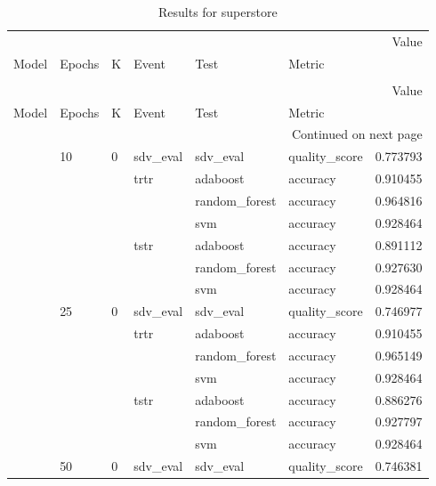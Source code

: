 \begin{longtable}{llllllr}
\caption{Results for superstore} \\
\toprule
 &  &  &  &  &  & Value \\
Model & Epochs & K & Event & Test & Metric &  \\
\midrule
\endfirsthead
\caption[]{Results for superstore} \\
\toprule
 &  &  &  &  &  & Value \\
Model & Epochs & K & Event & Test & Metric &  \\
\midrule
\endhead
\midrule
\multicolumn{7}{r}{Continued on next page} \\
\midrule
\endfoot
\bottomrule
\endlastfoot
\multirow[t]{35}{*}{CTGAN} & \multirow[t]{7}{*}{10} & \multirow[t]{7}{*}{0} & sdv_eval & sdv_eval & quality_score & 0.773793 \\
\cline{4-7} \cline{5-7}
 &  &  & \multirow[t]{3}{*}{trtr} & adaboost & accuracy & 0.910455 \\
\cline{5-7}
 &  &  &  & random_forest & accuracy & 0.964816 \\
\cline{5-7}
 &  &  &  & svm & accuracy & 0.928464 \\
\cline{4-7} \cline{5-7}
 &  &  & \multirow[t]{3}{*}{tstr} & adaboost & accuracy & 0.891112 \\
\cline{5-7}
 &  &  &  & random_forest & accuracy & 0.927630 \\
\cline{5-7}
 &  &  &  & svm & accuracy & 0.928464 \\
\cline{2-7} \cline{3-7} \cline{4-7} \cline{5-7}
 & \multirow[t]{7}{*}{25} & \multirow[t]{7}{*}{0} & sdv_eval & sdv_eval & quality_score & 0.746977 \\
\cline{4-7} \cline{5-7}
 &  &  & \multirow[t]{3}{*}{trtr} & adaboost & accuracy & 0.910455 \\
\cline{5-7}
 &  &  &  & random_forest & accuracy & 0.965149 \\
\cline{5-7}
 &  &  &  & svm & accuracy & 0.928464 \\
\cline{4-7} \cline{5-7}
 &  &  & \multirow[t]{3}{*}{tstr} & adaboost & accuracy & 0.886276 \\
\cline{5-7}
 &  &  &  & random_forest & accuracy & 0.927797 \\
\cline{5-7}
 &  &  &  & svm & accuracy & 0.928464 \\
\cline{2-7} \cline{3-7} \cline{4-7} \cline{5-7}
 & \multirow[t]{7}{*}{50} & \multirow[t]{7}{*}{0} & sdv_eval & sdv_eval & quality_score & 0.746381 \\
\cline{4-7} \cline{5-7}

\end{longtable}
